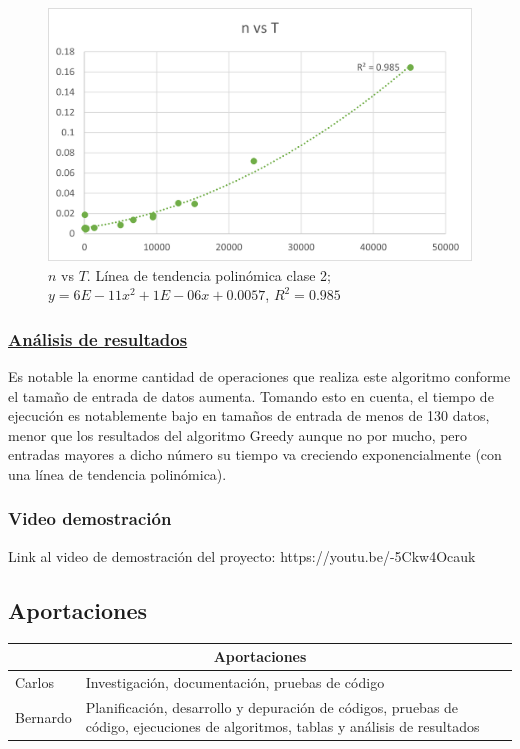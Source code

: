 \documentclass[12pt,letterpaper, titlepage, onecolumn]{article}
\begin{document}
			\begin{figure}[!]
				\centering
				\includegraphics{img/DP_nvsT.png}
				\caption{$n$ vs $T$. Línea de tendencia polinómica clase 2; $y = 6E-11x^2 + 1E-06x + 0.0057$, $R^2 = 0.985$}
			\end{figure}
			
		\pagebreak
		\subsubsection{\underline{Análisis de resultados}}
			\par Es notable la enorme cantidad de operaciones que realiza este algoritmo conforme el tamaño de entrada de datos aumenta. Tomando esto en cuenta, el tiempo de ejecución es notablemente bajo en tamaños de entrada de menos de 130 datos, menor que los resultados del algoritmo Greedy aunque no por mucho, pero entradas mayores a dicho número su tiempo va creciendo exponencialmente (con una línea de tendencia polinómica).
	\subsubsection{Video demostración}
		\par Link al video de demostración del proyecto: https://youtu.be/-5Ckw4Ocauk \\
		
\subsection{Aportaciones}
\begin{tabular}{ |p{3cm}|p{10cm}| }
	\hline
	\multicolumn{2}{|c|}{Aportaciones} \\
	\hline
	Carlos & Investigación, documentación, pruebas de código\\
	\hline
	Bernardo & Planificación, desarrollo y depuración de códigos, pruebas de código, ejecuciones de algoritmos, tablas y análisis de resultados\\
	\hline
\end{tabular}
\end{document}
